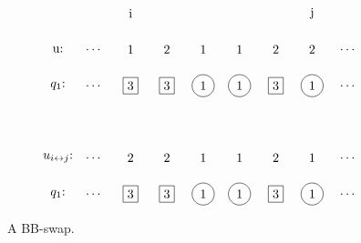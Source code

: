 \documentclass[reqno]{amsart}
\newcommand{\0}{\phantom{c}}
\theoremstyle{plain}
\theoremstyle{definition}
\numberwithin{equation}{section}
\begin{document}
\begin{figure}
\[
\begin{tikzpicture}
  \node at (0,6){i};
  \node at (5,6){j};
  \node at(-2,5){u:};
  \node at(-2,4){$q_1$:};
  \node at(-1,5){$\dots$};
  \node at(-1,4){$\dots$};
  \node at (6,5){$\dots$};
  \node at (6,4){$\dots$};
  \node at (0,5){1};
  \node at (1,5){2};
  \node at (2,5){1};
  \node at (3,5){1};
  \node at (4,5){2};
  \node at (5,5){2};
  \node[rectangle,draw=black] at (0, 4){3};
  \node[rectangle,draw=black] at (1, 4){3};
  \node[circle,draw=black]    at (2, 4){1};
  \node[circle,draw=black]    at (3, 4){1};
  \node[rectangle,draw=black] at (4, 4){3};
  \node[circle,draw=black]    at (5, 4){1};

  \node at(-2,2){$u_{i\leftrightarrow j}$:};
  \node at(-2,1){$q_1$:};
  \node at(-1,2){$\dots$};
  \node at(-1,1){$\dots$};
  \node at (6,2){$\dots$};
  \node at (6,1){$\dots$};
  \node at (0,2){2};
  \node at (1,2){2};
  \node at (2,2){1};
  \node at (3,2){1};
  \node at (4,2){2};
  \node at (5,2){1};
  \node[rectangle,draw=black] at (0, 1){3};
  \node[rectangle,draw=black] at (1, 1){3};
  \node[circle,draw=black]    at (2, 1){1};
  \node[circle,draw=black]    at (3, 1){1};
  \node[rectangle,draw=black] at (4, 1){3};
  \node[circle,draw=black]    at (5, 1){1};
\end{tikzpicture}
\]
\caption{A BB-swap.}
\end{figure}
\end{document}
